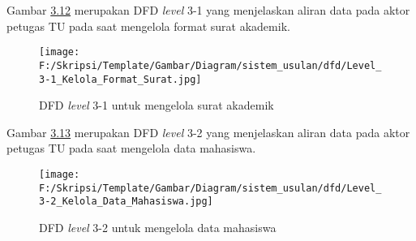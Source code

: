 Gambar \hyperlink{level_3-1}{3.12} merupakan DFD \textit{level} 3-1 yang menjelaskan aliran data pada aktor petugas TU pada saat mengelola format surat akademik.

\begin{figure}[H]
	\centering
		\texttt{[image: F:/Skripsi/Template/Gambar/Diagram/sistem\_usulan/dfd/Level\_3-1\_Kelola\_Format\_Surat.jpg]}
	\caption{DFD \textit{level} 3-1 untuk mengelola surat akademik}
	\label{fig:level_3-1}
\end{figure}

Gambar \hyperlink{level_3-2}{3.13} merupakan DFD \textit{level} 3-2 yang menjelaskan aliran data pada aktor petugas TU pada saat mengelola data mahasiswa.

\begin{figure}[H]
	\centering
		\texttt{[image: F:/Skripsi/Template/Gambar/Diagram/sistem\_usulan/dfd/Level\_3-2\_Kelola\_Data\_Mahasiswa.jpg]}
	\caption{DFD \textit{level} 3-2 untuk mengelola data mahasiswa}
	\label{fig:level_3-2}
\end{figure}

